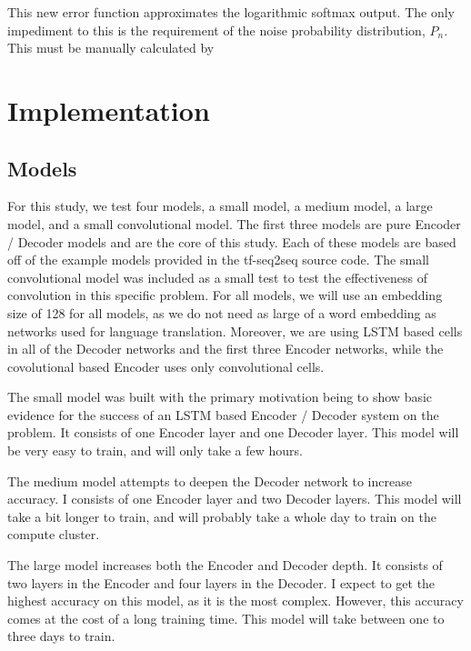 \documentclass[pageno]{jpaper}
\begin{document}
This new error function approximates the logarithmic softmax output.  The only impediment to this is the requirement of the noise probability distribution, $P_{n}$.  This must be manually calculated by 

\section{Implementation}

\subsection{Models}
For this study, we test four models, a small model, a medium model, a large model, and a small convolutional model.  The first three models are pure Encoder / Decoder models and are the core of this study.  Each of these models are based off of the example models provided in the tf-seq2seq source code.  The small convolutional model was included as a small test to test the effectiveness of convolution in this specific problem.  For all models, we will use an embedding size of 128 for all models, as we do not need as large of a word embedding as networks used for language translation.  Moreover, we are using LSTM based cells in all of the Decoder networks and the first three Encoder networks, while the covolutional based Encoder uses only convolutional cells.

\par
The small model was built with the primary motivation being to show basic evidence for the success of an LSTM based Encoder / Decoder system on the problem.  It consists of one Encoder layer and one Decoder layer.  This model will be very easy to train, and will only take a few hours.

\par
The medium model attempts to deepen the Decoder network to increase accuracy.  I consists of one Encoder layer and two Decoder layers.  This model will take a bit longer to train, and will probably take a whole day to train on the compute cluster. 

\par
The large model increases both the Encoder and Decoder depth.  It consists of two layers in the Encoder and four layers in the Decoder.  I expect to get the highest accuracy on this model, as it is the most complex.  However, this accuracy comes at the cost of a long training time. This model will take between one to three days to train.
\end{document}
